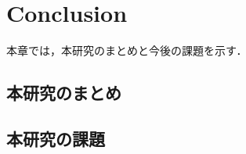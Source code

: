 \chapter{Conclusion}
\label{conclusion}

本章では，本研究のまとめと今後の課題を示す．

\section{本研究のまとめ}

\section{本研究の課題}

